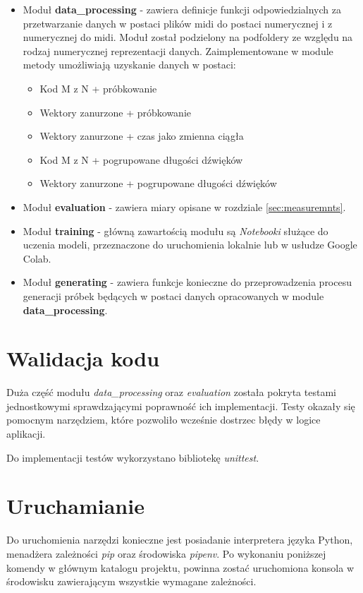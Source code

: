 {{        \begin{itemize}
            \setlength\itemsep{-0.5em}
            \item Moduł {\textbf {data\_processing}} - zawiera definicje funkcji odpowiedzialnych za przetwarzanie danych w postaci plików midi do postaci numerycznej i z numerycznej do midi. Moduł został podzielony na podfoldery ze względu na rodzaj numerycznej reprezentacji danych. Zaimplementowane w module metody umożliwiają uzyskanie danych w postaci:
            \begin{itemize}
                \setlength\itemsep{-0.5em}
                \item Kod M z N + próbkowanie
                \item Wektory zanurzone + próbkowanie
                \item Wektory zanurzone + czas jako zmienna ciągła
                \item Kod M z N + pogrupowane długości dźwięków
                \item Wektory zanurzone + pogrupowane długości dźwięków
            \end{itemize}
            \item Moduł {\textbf {evaluation}} - zawiera miary opisane w rozdziale \ref{sec:measuremnts}.
            \item Moduł {\textbf {training}} - główną zawartością modułu są {\textit {Notebooki}} służące do uczenia modeli, przeznaczone do uruchomienia lokalnie lub w usłudze Google Colab.
            \item Moduł {\textbf {generating}} - zawiera funkcje konieczne do przeprowadzenia procesu generacji próbek będących w postaci danych opracowanych w module \\ {\textbf {data\_processing}}.
        \end{itemize}
    }

    \section{Walidacja kodu}
    {
        Duża część modułu {\textit {data\_processing}} oraz {\textit {evaluation}} została pokryta testami jednostkowymi sprawdzającymi poprawność ich implementacji. 
        Testy okazały się pomocnym narzędziem, które pozwoliło wcześnie dostrzec błędy w logice aplikacji.

        Do implementacji testów wykorzystano bibliotekę {\textit {unittest}}.
    }

    \section{Uruchamianie}
    {
        Do uruchomienia narzędzi konieczne jest posiadanie interpretera języka Python, menadżera zależności {\textit {pip}} oraz środowiska {\textit {pipenv}}. Po wykonaniu poniższej komendy w głównym katalogu projektu, powinna zostać uruchomiona konsola w środowisku zawierającym wszystkie wymagane zależności.

}}
